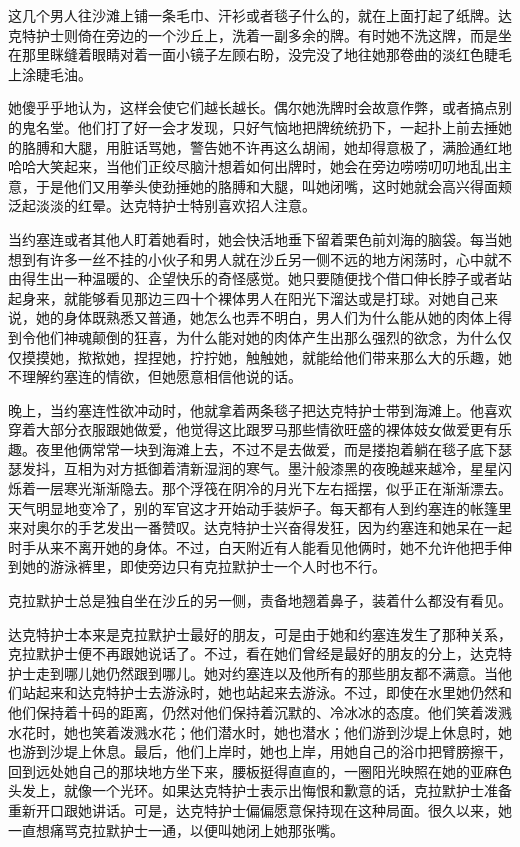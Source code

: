     这几个男人往沙滩上铺一条毛巾、汗衫或者毯子什么的，就在上面打起了纸牌。达克特护士则倚在旁边的一个沙丘上，洗着一副多余的牌。有时她不洗这牌，而是坐在那里眯缝着眼睛对着一面小镜子左顾右盼，没完没了地往她那卷曲的淡红色睫毛上涂睫毛油。

    她傻乎乎地认为，这样会使它们越长越长。偶尔她洗牌时会故意作弊，或者搞点别的鬼名堂。他们打了好一会才发现，只好气恼地把牌统统扔下，一起扑上前去捶她的胳膊和大腿，用脏话骂她，警告她不许再这么胡闹，她却得意极了，满脸通红地哈哈大笑起来，当他们正绞尽脑汁想着如何出牌时，她会在旁边唠唠叨叨地乱出主意，于是他们又用拳头使劲捶她的胳膊和大腿，叫她闭嘴，这时她就会高兴得面颊泛起淡淡的红晕。达克特护士特别喜欢招人注意。

    当约塞连或者其他人盯着她看时，她会快活地垂下留着栗色前刘海的脑袋。每当她想到有许多一丝不挂的小伙子和男人就在沙丘另一侧不远的地方闲荡时，心中就不由得生出一种温暖的、企望快乐的奇怪感觉。她只要随便找个借口伸长脖子或者站起身来，就能够看见那边三四十个裸体男人在阳光下溜达或是打球。对她自己来说，她的身体既熟悉又普通，她怎么也弄不明白，男人们为什么能从她的肉体上得到令他们神魂颠倒的狂喜，为什么能对她的肉体产生出那么强烈的欲念，为什么仅仅摸摸她，揿揿她，捏捏她，拧拧她，触触她，就能给他们带来那么大的乐趣，她不理解约塞连的情欲，但她愿意相信他说的话。
 


    晚上，当约塞连性欲冲动时，他就拿着两条毯子把达克特护士带到海滩上。他喜欢穿着大部分衣服跟她做爱，他觉得这比跟罗马那些情欲旺盛的裸体妓女做爱更有乐趣。夜里他俩常常一块到海滩上去，不过不是去做爱，而是搂抱着躺在毯子底下瑟瑟发抖，互相为对方抵御着清新湿润的寒气。墨汁般漆黑的夜晚越来越冷，星星闪烁着一层寒光渐渐隐去。那个浮筏在阴冷的月光下左右摇摆，似乎正在渐渐漂去。天气明显地变冷了，别的军官这才开始动手装炉子。每天都有人到约塞连的帐篷里来对奥尔的手艺发出一番赞叹。达克特护士兴奋得发狂，因为约塞连和她呆在一起时手从来不离开她的身体。不过，白天附近有人能看见他俩时，她不允许他把手伸到她的游泳裤里，即使旁边只有克拉默护士一个人时也不行。

    克拉默护士总是独自坐在沙丘的另一侧，责备地翘着鼻子，装着什么都没有看见。

    达克特护士本来是克拉默护士最好的朋友，可是由于她和约塞连发生了那种关系，克拉默护士便不再跟她说话了。不过，看在她们曾经是最好的朋友的分上，达克特护士走到哪儿她仍然跟到哪儿。她对约塞连以及他所有的那些朋友都不满意。当他们站起来和达克特护士去游泳时，她也站起来去游泳。不过，即使在水里她仍然和他们保持着十码的距离，仍然对他们保持着沉默的、冷冰冰的态度。他们笑着泼溅水花时，她也笑着泼溅水花；他们潜水时，她也潜水；他们游到沙堤上休息时，她也游到沙堤上休息。最后，他们上岸时，她也上岸，用她自己的浴巾把臂膀擦干，回到远处她自己的那块地方坐下来，腰板挺得直直的，一圈阳光映照在她的亚麻色头发上，就像一个光环。如果达克特护士表示出悔恨和歉意的话，克拉默护士准备重新开口跟她讲话。可是，达克特护士偏偏愿意保持现在这种局面。很久以来，她一直想痛骂克拉默护士一通，以便叫她闭上她那张嘴。

